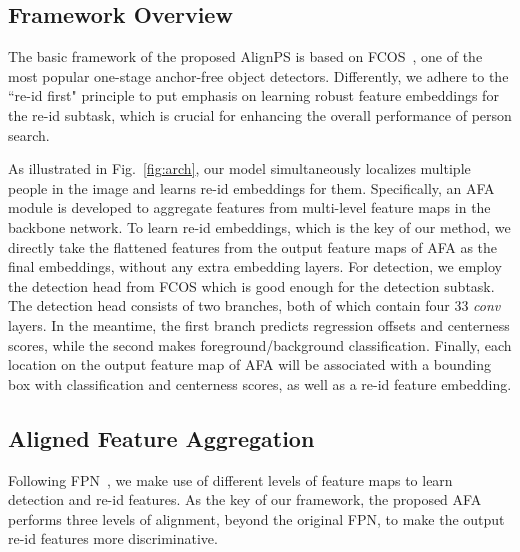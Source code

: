 \documentclass[final]{cvpr}
\begin{document}
\subsection{Framework Overview}
The basic framework of the proposed AlignPS is based on FCOS~\cite{DBLP:conf/iccv/TianSCH19}, one of the most popular one-stage anchor-free object detectors. Differently, we adhere to the ``re-id first" principle to put emphasis on learning robust feature embeddings for the re-id subtask, which is crucial for enhancing the overall performance of person search.

As illustrated in Fig.~\ref{fig:arch}, our model simultaneously localizes multiple people in the image and learns re-id embeddings for them. Specifically, an AFA module is developed to aggregate features from multi-level feature maps in the backbone network. To learn re-id embeddings, which is the key of our method, we directly take the flattened features from the output feature maps of AFA as the final embeddings, without any extra embedding layers. For detection, we employ the detection head from FCOS which is good enough for the detection subtask. The detection head consists of two branches, both of which contain four 33 \emph{conv} layers. In the meantime, the first branch predicts regression offsets and centerness scores, while the second makes foreground/background classification. Finally, each location on the output feature map of AFA will be associated with a bounding box with classification and centerness scores, as well as a re-id feature embedding.

\subsection{Aligned Feature Aggregation}
Following FPN~\cite{DBLP:conf/cvpr/LinDGHHB17}, we make use of different levels of feature maps to learn detection and re-id features. As the key of our framework, the proposed AFA performs three levels of alignment, beyond the original FPN, to make the output re-id features more discriminative.
\end{document}
